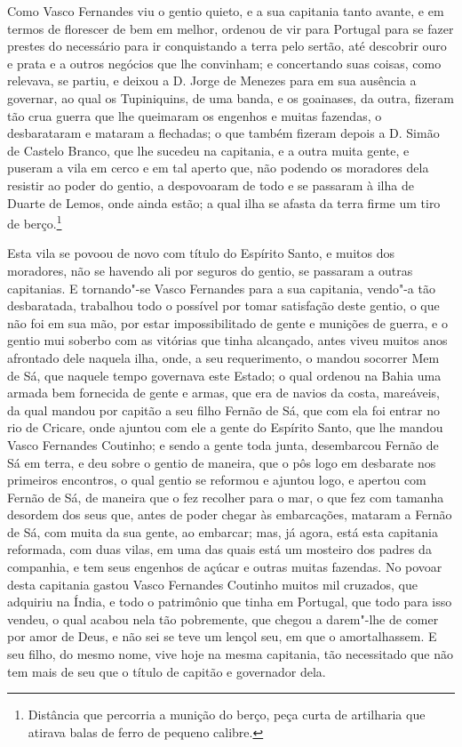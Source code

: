 Como Vasco Fernandes viu o gentio quieto, e a sua capitania tanto avante, e em termos de
florescer de bem em melhor, ordenou de vir para Portugal para se fazer prestes do
necessário para ir conquistando a terra pelo sertão, até descobrir ouro e prata e a outros
negócios que lhe convinham; e concertando suas coisas, como relevava, se partiu, e deixou
a D. Jorge de Menezes para em sua ausência a governar, ao qual os Tupiniquins, de uma
banda, e os goainases, da outra, fizeram tão crua guerra que lhe queimaram os engenhos e
muitas fazendas, o desbarataram e mataram a flechadas; o que também fizeram depois a D.
Simão de Castelo Branco, que lhe sucedeu na capitania, e a outra muita gente, e puseram a
vila em cerco e em tal aperto que, não podendo os moradores dela resistir ao poder do
gentio, a despovoaram de todo e se passaram à ilha de Duarte de Lemos, onde ainda estão; a
qual ilha se afasta da terra firme um tiro de berço.\footnote{ Distância que percorria a munição do berço, peça curta de artilharia que atirava balas de ferro de pequeno calibre.}

Esta vila se povoou de novo com título do Espírito Santo, e muitos dos moradores, não se
havendo ali por seguros do gentio, se passaram a outras capitanias. E tornando"-se Vasco
Fernandes para a sua capitania, vendo"-a tão desbaratada, trabalhou todo o possível por
tomar satisfação deste gentio, o que não foi em sua mão, por estar impossibilitado de
gente e munições de guerra, e o gentio mui soberbo com as vitórias que tinha alcançado,
antes viveu muitos anos afrontado dele naquela ilha, onde, a seu requerimento, o mandou
socorrer Mem de Sá, que naquele tempo governava este Estado; o qual ordenou na Bahia uma
armada bem fornecida de gente e armas, que era de navios da costa, mareáveis, da qual
mandou por capitão a seu filho Fernão de Sá, que com ela foi entrar no rio de Cricare,
onde ajuntou com ele a gente do Espírito Santo, que lhe mandou Vasco Fernandes Coutinho; e
sendo a gente toda junta, desembarcou Fernão de Sá em terra, e deu sobre o gentio de
maneira, que o pôs logo em desbarate nos primeiros encontros, o qual gentio se reformou e
ajuntou logo, e apertou com Fernão de Sá, de maneira que o fez recolher para o mar, o que
fez com tamanha desordem dos seus que, antes de poder chegar às embarcações, mataram a
Fernão de Sá, com muita da sua gente, ao embarcar; mas, já agora, está esta capitania
reformada, com duas vilas, em uma das quais está um mosteiro dos padres da companhia, e
tem seus engenhos de açúcar e outras muitas fazendas. No povoar desta capitania gastou
Vasco Fernandes Coutinho muitos mil cruzados, que adquiriu na Índia, e todo o patrimônio
que tinha em Portugal, que todo para isso vendeu, o qual acabou nela tão pobremente, que
chegou a darem"-lhe de comer por amor de Deus, e não sei se teve um lençol seu, em que o
amortalhassem. E seu filho, do mesmo nome, vive hoje na mesma capitania, tão necessitado
que não tem mais de seu que o título de capitão e governador dela.

